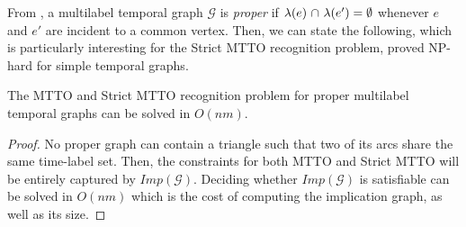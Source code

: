 \documentclass[runningheads]{llncs}
\begin{document}
From \cite{casteigts2024simple}, a multilabel temporal graph $\mathcal{G}$ is \textit{proper} if $\lambda(e) \hspace{0.25ex} \cap \hspace{0.25ex} \lambda(e') = \emptyset$ whenever $e$ and $e'$ are incident to a common vertex. Then, we can state the following, which is particularly interesting for the Strict MTTO recognition problem, proved NP-hard for simple temporal graphs.

\begin{theorem}
The MTTO and Strict MTTO recognition problem for proper multilabel temporal graphs can be solved in $O(nm)$.
\label{theo:recognition-proper-temporal-graphs}
\end{theorem}

\begin{proof}
No proper graph can contain a triangle such that two of its arcs share the same time-label set. Then, the constraints for both MTTO and Strict MTTO will be entirely captured by $Imp(\mathcal{G})$. Deciding whether $Imp(\mathcal{G})$ is satisfiable can be solved in $O(nm)$ which is the cost of computing the implication graph, as well as its size. %
\end{proof}
\end{document}
